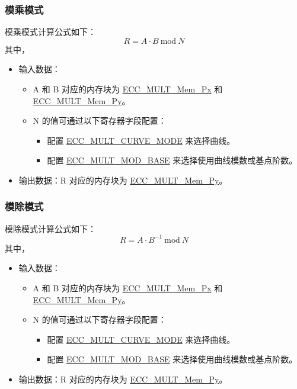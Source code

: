\documentclass[main\_\_CN.tex]{subfiles}
\begin{document}
\subsubsection{模乘模式}
模乘模式计算公式如下：
\[
R = A \cdot B \ \textrm{mod}\ N
\]
其中，
\begin{itemize}
    \item 输入数据：
    \begin{itemize}
        \item A 和 B 对应的内存块为 \hyperref[tab:ecc-memory]{ECC\_MULT\_Mem\_Px} 和 \hyperref[tab:ecc-memory]{ECC\_MULT\_Mem\_Py}。
        \item N 的值可通过以下寄存器字段配置：
        \begin{itemize}
            \item 配置 \hyperref[fielddesc:ECCMULTCURVEMODE]{ECC\_MULT\_CURVE\_MODE} 来选择曲线。
            \item 配置 \hyperref[fielddesc:ECCMULTMODBASE]{ECC\_MULT\_MOD\_BASE} 来选择使用曲线模数或基点阶数。
        \end{itemize}
    \end{itemize}
    \item 输出数据：R 对应的内存块为 \hyperref[tab:ecc-memory]{ECC\_MULT\_Mem\_Py}。
\end{itemize}

\subsubsection{模除模式}
模除模式计算公式如下：
\[
R = A \cdot {B}^{-1} \ \textrm{mod}\ N
\]
其中，
\begin{itemize}
    \item 输入数据：
    \begin{itemize}
        \item A 和 B 对应的内存块为 \hyperref[tab:ecc-memory]{ECC\_MULT\_Mem\_Px} 和 \hyperref[tab:ecc-memory]{ECC\_MULT\_Mem\_Py}。
        \item N 的值可通过以下寄存器字段配置：
        \begin{itemize}
            \item 配置 \hyperref[fielddesc:ECCMULTCURVEMODE]{ECC\_MULT\_CURVE\_MODE} 来选择曲线。
            \item 配置 \hyperref[fielddesc:ECCMULTMODBASE]{ECC\_MULT\_MOD\_BASE} 来选择使用曲线模数或基点阶数。
        \end{itemize}
    \end{itemize}
    \item 输出数据：R 对应的内存块为 \hyperref[tab:ecc-memory]{ECC\_MULT\_Mem\_Py}。
\end{itemize}
\end{document}

